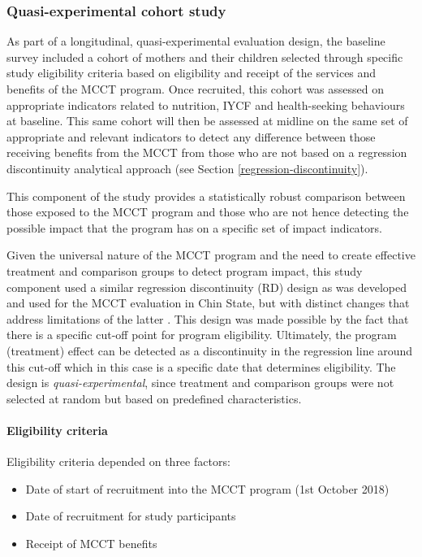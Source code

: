 \documentclass[12pt,a4paper]{article}
\let\oldparagraph\paragraph
\renewcommand{\paragraph}[1]{\oldparagraph{#1}\mbox{}}
\begin{document}
\hypertarget{study2}{%
\subsubsection{Quasi-experimental cohort study}\label{study2}}

As part of a longitudinal, quasi-experimental evaluation design, the baseline survey included a cohort of mothers and their children selected through specific study eligibility criteria based on eligibility and receipt of the services and benefits of the MCCT program. Once recruited, this cohort was assessed on appropriate indicators related to nutrition, IYCF and health-seeking behaviours at baseline. This same cohort will then be assessed at midline on the same set of appropriate and relevant indicators to detect any difference between those receiving benefits from the MCCT from those who are not based on a regression discontinuity analytical approach (see Section \ref{regression-discontinuity}).

This component of the study provides a statistically robust comparison between those exposed to the MCCT program and those who are not hence detecting the possible impact that the program has on a specific set of impact indicators.

Given the universal nature of the MCCT program and the need to create effective treatment and comparison groups to detect program impact, this study component used a similar regression discontinuity (RD) design as was developed and used for the MCCT evaluation in Chin State, but with distinct changes that address limitations of the latter \citep{MinistryofSocialWelfareReliefandResettlement2018}. This design was made possible by the fact that there is a specific cut-off point for program eligibility. Ultimately, the program (treatment) effect can be detected as a discontinuity in the regression line around this cut-off which in this case is a specific date that determines eligibility. The design is \emph{quasi-experimental}, since treatment and comparison groups were not selected at random but based on predefined characteristics.

\hypertarget{eligibility}{%
\paragraph{Eligibility criteria}\label{eligibility}}

Eligibility criteria depended on three factors:

\begin{itemize}
\item
  Date of start of recruitment into the MCCT program (1st October 2018)
\item
  Date of recruitment for study participants
\item
  Receipt of MCCT benefits
\end{itemize}
\end{document}

